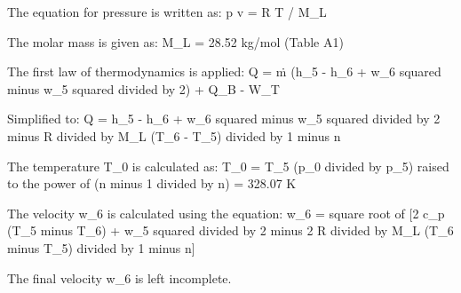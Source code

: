 The equation for pressure is written as:  
p v = R T / M_L  

The molar mass is given as:  
M_L = 28.52 kg/mol (Table A1)  

The first law of thermodynamics is applied:  
Q = ṁ (h_5 - h_6 + w_6 squared minus w_5 squared divided by 2) + Q_B - W_T  

Simplified to:  
Q = h_5 - h_6 + w_6 squared minus w_5 squared divided by 2 minus R divided by M_L (T_6 - T_5) divided by 1 minus n  

The temperature T_0 is calculated as:  
T_0 = T_5 (p_0 divided by p_5) raised to the power of (n minus 1 divided by n) = 328.07 K  

The velocity w_6 is calculated using the equation:  
w_6 = square root of [2 c_p (T_5 minus T_6) + w_5 squared divided by 2 minus 2 R divided by M_L (T_6 minus T_5) divided by 1 minus n]  

The final velocity w_6 is left incomplete.